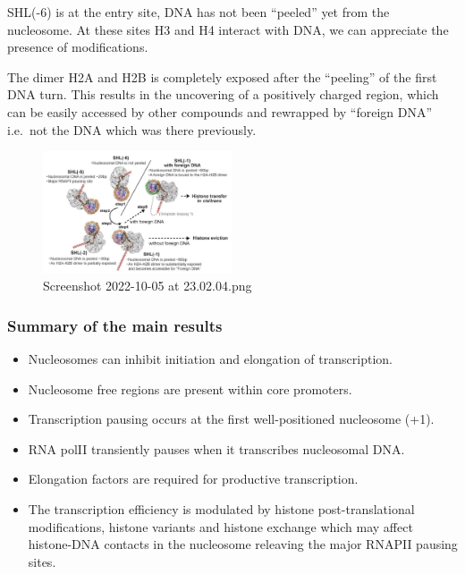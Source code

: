 SHL(-6) is at the entry site, DNA has not been ``peeled'' yet from the nucleosome. At these sites H3 and H4 interact with DNA, we can appreciate the presence of modifications.

The dimer H2A and H2B is completely exposed after the ``peeling'' of the first DNA turn. This results in the uncovering of a positively charged region, which can be easily accessed by other compounds and rewrapped by ``foreign DNA'' i.e.~not the DNA which was there previously.

\begin{figure}
\centering
\includegraphics[width=0.5\textwidth]{../_resources/Screenshot_2022-10-05_at_23-02-04.png}
\caption{Screenshot 2022-10-05 at 23.02.04.png}
\end{figure}

\hypertarget{summary-of-the-main-results}{%
\subsubsection{Summary of the main results}\label{summary-of-the-main-results}}

\begin{itemize}
\tightlist
\item
  Nucleosomes can inhibit initiation and elongation of transcription.
\item
  Nucleosome free regions are present within core promoters.
\item
  Transcription pausing occurs at the first well-positioned nucleosome (+1).
\item
  RNA polII transiently pauses when it transcribes nucleosomal DNA.
\item
  Elongation factors are required for productive transcription.
\item
  The transcription efficiency is modulated by histone post-translational modifications, histone variants and histone exchange which may affect histone-DNA contacts in the nucleosome releaving the major RNAPII pausing sites.
\end{itemize}

